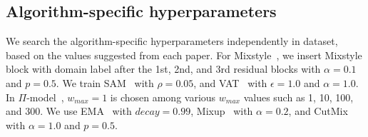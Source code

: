 \subsection{Algorithm-specific hyperparameters}

We search the algorithm-specific hyperparameters independently in  dataset, based on the values suggested from each paper. For Mixstyle~\cite{zhou2021mixstyle}, we insert Mixstyle block with domain label after the 1st, 2nd, and 3rd residual blocks with $\alpha=0.1$ and $p=0.5$. We train SAM~\cite{foret2020sharpness} with $\rho=0.05$, and VAT~\cite{miyato2018vat} with $\epsilon=1.0$ and $\alpha=1.0$. In $\Pi$-model~\cite{LaineA17iclr_pi_model}, $w_{max}=1$ is chosen among various $w_{max}$ values such as 1, 10, 100, and 300.
We use EMA~\cite{polyak1992ema} with $decay=0.99$, Mixup~\cite{zhang2018mixup} with $\alpha=0.2$, and CutMix~\cite{yun2019cutmix} with $\alpha=1.0$ and $p=0.5$.




